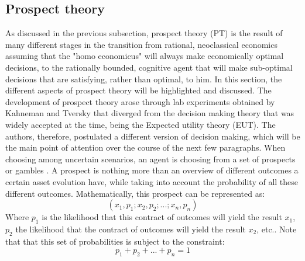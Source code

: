\subsection{\large{Prospect theory}} \label{ProspectTheory}
As discussed in the previous subsection, prospect theory (PT) is the result of many different stages in the transition from rational, neoclassical economics assuming that the "homo economicus" will always make economically optimal decisions, to the rationally bounded, cognitive agent that will make sub-optimal decisions that are satisfying, rather than optimal, to him. In this section, the different aspects of prospect theory will be highlighted and discussed. The development of prospect theory arose through lab experiments obtained by Kahneman and Tversky that diverged from the decision making theory that was widely accepted at the time, being the Expected utility theory (EUT). The authors, therefore, postulated a different version of decision making, which will be the main point of attention over the course of the next few paragraphs.
\newline \newline \noindent
When choosing among uncertain scenarios, an agent is choosing from a set of prospects or gambles \cite{prospect1}. A prospect is nothing more than an overview of different outcomes a certain asset evolution have, while taking into account the probability of all these different outcomes. Mathematically, this prospect can be represented as:
 \begin{equation}
     (x_1,p_1; x_2,p_2;...;x_n,p_n)
 \end{equation}
 Where $p_1$ is the likelihood that this contract of outcomes will yield the result $x_1$, $p_2$ the likelihood that the contract of outcomes will yield the result $x_2$, etc.. Note that that this set of probabilities is subject to the constraint:
 \begin{equation}
     p_1 + p_2 + ... + p_n = 1 
 \end{equation}
